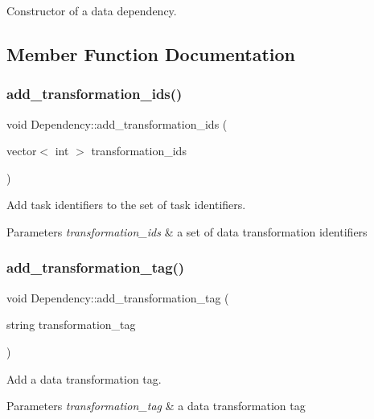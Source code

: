 Constructor of a data dependency. 

\subsection{Member Function Documentation}
\mbox{\label{classDependency_aba3c43b4eb1e2429143cf297122f92ef}} 
\subsubsection{\texorpdfstring{add\+\_\+transformation\+\_\+ids()}{add\_transformation\_ids()}}
{\footnotesize\ttfamily void Dependency\+::add\+\_\+transformation\+\_\+ids (\begin{DoxyParamCaption}\item[{vector$<$ int $>$}]{transformation\+\_\+ids }\end{DoxyParamCaption})}

Add task identifiers to the set of task identifiers. 
\begin{DoxyParams}{Parameters}
{\em transformation\+\_\+ids} & a set of data transformation identifiers \\
\hline
\end{DoxyParams}
\mbox{\label{classDependency_a2436d5c4e0363832d2f81163467de426}} 
\subsubsection{\texorpdfstring{add\+\_\+transformation\+\_\+tag()}{add\_transformation\_tag()}}
{\footnotesize\ttfamily void Dependency\+::add\+\_\+transformation\+\_\+tag (\begin{DoxyParamCaption}\item[{string}]{transformation\+\_\+tag }\end{DoxyParamCaption})}

Add a data transformation tag. 
\begin{DoxyParams}{Parameters}
{\em transformation\+\_\+tag} & a data transformation tag \\
\hline
\end{DoxyParams}
\mbox{\label{classDependency_adbff6153e89ab5a4143ee4f139a6f43a}} 

